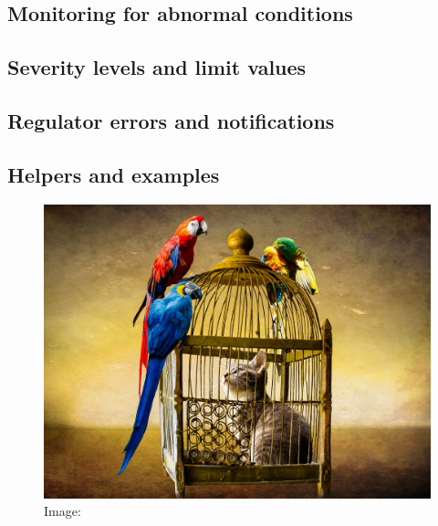 \documentclass[aspectratio=169]{beamer}
\begin{document}
\addtocounter{framenumber}{-1}
\begin{frame}[plain]
\section{Monitoring for abnormal conditions}
\subsection{Severity levels and limit values}
\subsection{Regulator errors and notifications}
\subsection{Helpers and examples}
\begin{figure}
\includegraphics[scale=0.36]{image_dl/kissa-hakissa.jpg} \\
\scriptsize Image: 
\end{figure}
\end{frame}


\end{document}
